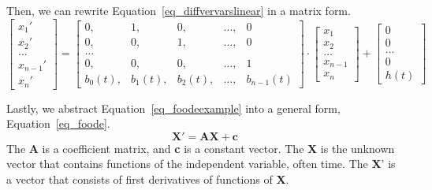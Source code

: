 Then, we can rewrite Equation~\ref{eq_diffvervarslinear} in a matrix form.
\begin{equation} \label{eq_foodeexample}
	\begin{bmatrix}
		x_{1}' \\
    x_{2}' \\
    \dots  \\
    x_{n-1}' \\
    x_{n}'
	\end{bmatrix}
    = 
  \begin{bmatrix}
		0, & 1, & 0, & \dots, & 0 \\
    0, & 0, & 1, & \dots, & 0 \\
    \dots \\
    0, & 0, & 0, & \dots, & 1 \\
    b_{0}(t), & b_{1}(t), & b_{2}(t), & \dots, & b_{n-1}(t)
	\end{bmatrix}
    \cdot
  \begin{bmatrix}
		x_{1} \\
    x_{2} \\
    \dots  \\
    x_{n-1} \\
    x_{n}
	\end{bmatrix}
    + 
  \begin{bmatrix}
    0 \\
    0 \\
    \dots  \\
    0 \\
    h(t)
	\end{bmatrix}
\end{equation}

Lastly, we abstract Equation~\ref{eq_foodeexample} into a general form, Equation~\ref{eq_foode}. 
\begin{equation} \label{eq_foode}
    \boldsymbol{X}' = \boldsymbol{AX} + \boldsymbol{c}
\end{equation}
The \textbf{A} is a coefficient matrix, and \textbf{c} is a constant vector. The \textbf{X} is the unknown vector that contains functions of the independent variable, often time. The \textbf{X}' is a vector that consists of first derivatives of functions of \textbf{X}.


